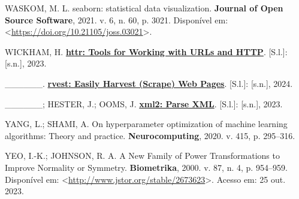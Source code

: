 \documentclass[
  12pt,
  a4paper,
]{scrreprt}
\newlength{\cslhangindent}
\newenvironment{CSLReferences}[2] %
 {\begin{list}{}{%
  \setlength{\itemindent}{0pt}
  \setlength{\leftmargin}{0pt}
  \setlength{\parsep}{0pt}
  \ifodd #1
   \setlength{\leftmargin}{\cslhangindent}
   \setlength{\itemindent}{-1\cslhangindent}
  \fi
  \setlength{\itemsep}{#2\baselineskip}}}
 {\end{list}}
\begin{document}
\begin{CSLReferences}{0}{1}
WASKOM, M. L. seaborn: statistical data visualization. \textbf{Journal
of Open Source Software}, 2021. v. 6, n. 60, p. 3021. Disponível em:
\textless{}\url{https://doi.org/10.21105/joss.03021}\textgreater.

WICKHAM, H. \textbf{\href{https://CRAN.R-project.org/package=httr}{httr:
Tools for Working with URLs and HTTP}}. {[}S.l.{]}: {[}s.n.{]}, 2023.

\_\_\_\_\_\_. \textbf{\href{https://rvest.tidyverse.org/}{rvest: Easily
Harvest (Scrape) Web Pages}}. {[}S.l.{]}: {[}s.n.{]}, 2024.

\_\_\_\_\_\_; HESTER, J.; OOMS, J.
\textbf{\href{https://xml2.r-lib.org/}{xml2: Parse XML}}. {[}S.l.{]}:
{[}s.n.{]}, 2023.

YANG, L.; SHAMI, A. On hyperparameter optimization of machine learning
algorithms: Theory and practice. \textbf{Neurocomputing}, 2020. v. 415,
p. 295--316.

YEO, I.-K.; JOHNSON, R. A. A New Family of Power Transformations to
Improve Normality or Symmetry. \textbf{Biometrika}, 2000. v. 87, n. 4,
p. 954--959. Disponível em:
\textless{}\url{http://www.jstor.org/stable/2673623}\textgreater. Acesso
em: 25 out. 2023.

\end{CSLReferences}
\end{document}
